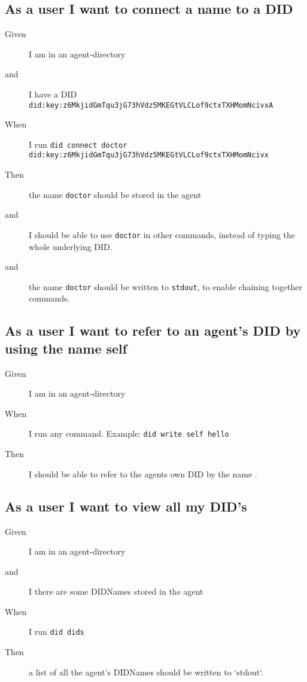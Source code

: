 \subsection{As a user I want to connect a name to a DID}
\begin{description}\begin{description}
    \item[Given] I am in an agent-directory
    \item[and] I have a DID \texttt{did:key:z6MkjidGmTqu3jG73hVdz5MKEGtVLCLof9ctxTXHMomNcivxA}
    \item[When] I run \texttt{did connect doctor did:key:z6MkjidGmTqu3jG73hVdz5MKEGtVLCLof9ctxTXHMomNcivx}
    \item[Then] the name \texttt{doctor} should be stored in the agent
    \item[and] I should be able to use \texttt{doctor} in other commands, instead of typing the whole underlying DID.
    \item[and] the name \texttt{doctor} should be written to \texttt{stdout}, to enable chaining together commands.
\end{description}\end{description}


\subsection{As a user I want to refer to an agent's DID by using the name self}
\begin{description}\begin{description}
    \item[Given] I am in an agent-directory
    \item[When] I run any command. Example: \texttt{did write self hello}
    \item[Then] I should be able to refer to the agents own DID by the name .
\end{description}\end{description}


\subsection{As a user I want to view all my DID's}
\begin{description}\begin{description}
    \item[Given] I am in an agent-directory
    \item[and] I there are some DIDNames stored in the agent
    \item[When] I run \texttt{did dids}
    \item[Then] a list of all the agent's DIDNames should be written to `stdout`.
\end{description}\end{description}


